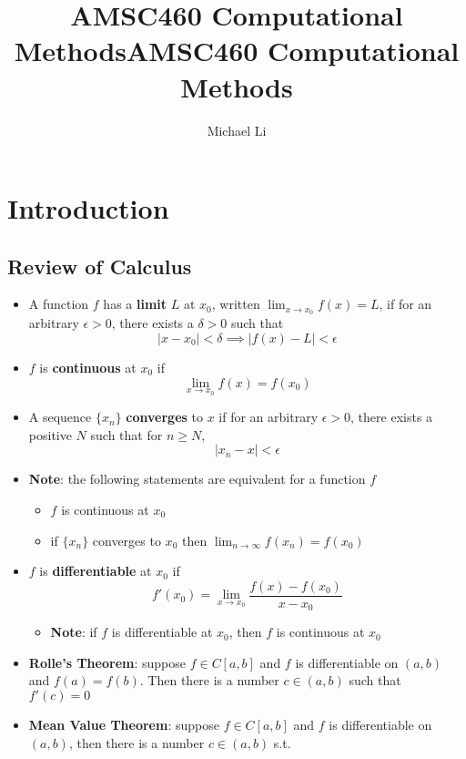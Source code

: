 \documentclass{article}
\date{}
\title{AMSC460 Computational Methods}
\begin{document}
 
  \author{Michael Li}
  \title{AMSC460 Computational Methods}
  \maketitle
  \tableofcontents
  \newpage
  \section{Introduction}
  \subsection{Review of Calculus}
  \begin{itemize}
    \item A function $f$ has a \textbf{limit} $L$ at $x_0$, written $\lim_{x \rightarrow x_0}f(x) = L$, if for an arbitrary $\epsilon > 0$, there exists a $\delta > 0$ such that
  \[|x - x_0| < \delta \implies |f(x) - L| < \epsilon\]
    \item $f$ is \textbf{continuous} at $x_0$ if
  \[\lim_{x \rightarrow x_0} f(x) = f(x_0)\]
    \item A sequence $\{x_n\}$ \textbf{converges} to $x$ if for an arbitrary $\epsilon > 0$, there exists a positive $N$ such that for $n \geq N,$
  \[|x_n - x| < \epsilon\]
    \item \textbf{Note}: the following statements are equivalent for a function $f$
      \begin{itemize}
        \item $f$ is continuous at $x_0$
        \item if $\{x_n\}$ converges to $x_0$ then $\lim_{n \rightarrow \infty} f(x_n) = f(x_0)$
      \end{itemize}
    \item $f$ is \textbf{differentiable} at $x_0$ if
      \[f'(x_0) = \lim_{x \rightarrow x_0} \frac{f(x) - f(x_0)}{x - x_0}\]
      \begin{itemize}
        \item \textbf{Note}: if $f$ is differentiable at $x_0$, then $f$ is continuous at $x_0$
      \end{itemize}
    \item \textbf{Rolle's Theorem}: suppose $f \in C[a,b]$ and $f$ is differentiable on $(a,b)$ and $f(a) = f(b)$. Then there is a number $c \in (a,b)$ such that $f'(c) = 0$
    \item \textbf{Mean Value Theorem}: suppose $f \in C[a,b]$ and $f$ is differentiable on $(a,b)$, then there is a number $c \in (a,b)$ s.t.

\end{itemize}
\end{document}
